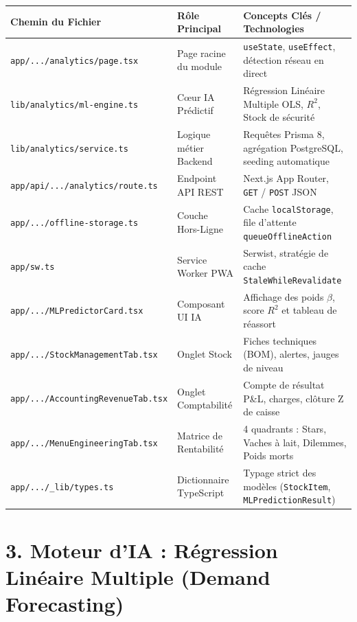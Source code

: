 \documentclass[10pt,a4paper]{article}
\begin{document}
\begin{center}
\small
\begin{tabular}{@{}p{6.5cm}p{4cm}p{6cm}@{}}
\toprule
\textbf{Chemin du Fichier} & \textbf{Rôle Principal} & \textbf{Concepts Clés / Technologies} \\
\midrule
\texttt{app/.../analytics/page.tsx} & Page racine du module & \texttt{useState}, \texttt{useEffect}, détection réseau en direct \\
\texttt{lib/analytics/ml-engine.ts} & Cœur IA Prédictif & Régression Linéaire Multiple OLS, $R^2$, Stock de sécurité \\
\texttt{lib/analytics/service.ts} & Logique métier Backend & Requêtes Prisma 8, agrégation PostgreSQL, seeding automatique \\
\texttt{app/api/.../analytics/route.ts} & Endpoint API REST & Next.js App Router, \texttt{GET} / \texttt{POST} JSON \\
\texttt{app/.../offline-storage.ts} & Couche Hors-Ligne & Cache \texttt{localStorage}, file d'attente \texttt{queueOfflineAction} \\
\texttt{app/sw.ts} & Service Worker PWA & Serwist, stratégie de cache \texttt{StaleWhileRevalidate} \\
\texttt{app/.../MLPredictorCard.tsx} & Composant UI IA & Affichage des poids $\beta$, score $R^2$ et tableau de réassort \\
\texttt{app/.../StockManagementTab.tsx} & Onglet Stock & Fiches techniques (BOM), alertes, jauges de niveau \\
\texttt{app/.../AccountingRevenueTab.tsx} & Onglet Comptabilité & Compte de résultat P\&L, charges, clôture Z de caisse \\
\texttt{app/.../MenuEngineeringTab.tsx} & Matrice de Rentabilité & 4 quadrants : Stars, Vaches à lait, Dilemmes, Poids morts \\
\texttt{app/.../\_lib/types.ts} & Dictionnaire TypeScript & Typage strict des modèles (\texttt{StockItem}, \texttt{MLPredictionResult}) \\
\bottomrule
\end{tabular}
\end{center}

\section*{\textcolor{restivored}{3. Moteur d'IA : Régression Linéaire Multiple (Demand Forecasting)}}
\end{document}
